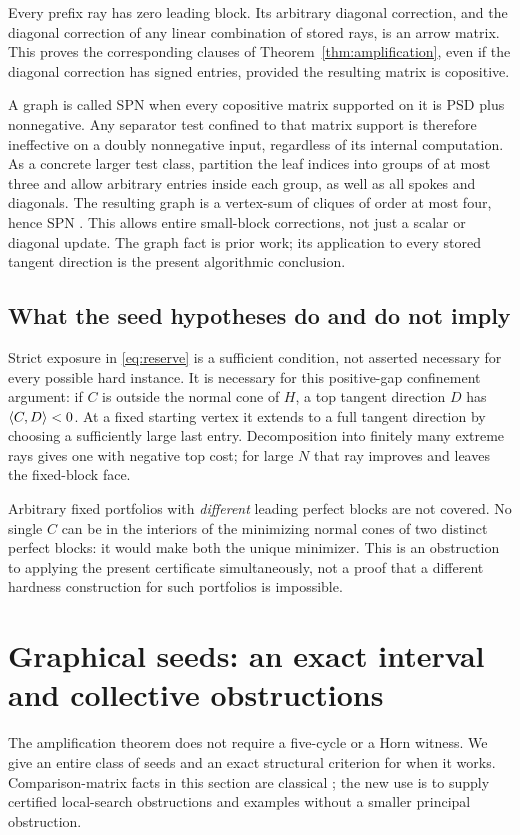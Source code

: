 \documentclass[11pt]{article}
\theoremstyle{definition}\newtheorem{definition}[theorem]{Definition}
\theoremstyle{remark}\newtheorem{remark}[theorem]{Remark}
\begin{document}
Every prefix ray has zero leading block. Its arbitrary diagonal correction, and the diagonal correction of any linear combination of stored rays, is an arrow matrix. This proves the corresponding clauses of Theorem~\ref{thm:amplification}, even if the diagonal correction has signed entries, provided the resulting matrix is copositive.

A graph is called SPN when every copositive matrix supported on it is PSD plus nonnegative. Any separator test confined to that matrix support is therefore ineffective on a doubly nonnegative input, regardless of its internal computation. As a concrete larger test class, partition the leaf indices into groups of at most three and allow arbitrary entries inside each group, as well as all spokes and diagonals. The resulting graph is a vertex-sum of cliques of order at most four, hence SPN \cite[Corollaries 4.4 and 5.3]{SPN}. This allows entire small-block corrections, not just a scalar or diagonal update. The graph fact is prior work; its application to every stored tangent direction is the present algorithmic conclusion.

\subsection{What the seed hypotheses do and do not imply}
Strict exposure in \eqref{eq:reserve} is a sufficient condition, not asserted necessary for every possible hard instance. It is necessary for this positive-gap confinement argument: if $C$ is outside the normal cone of $H$, a top tangent direction $D$ has $\langle C,D\rangle<0$. At a fixed starting vertex it extends to a full tangent direction by choosing a sufficiently large last entry. Decomposition into finitely many extreme rays gives one with negative top cost; for large $N$ that ray improves and leaves the fixed-block face.

Arbitrary fixed portfolios with \emph{different} leading perfect blocks are not covered. No single $C$ can be in the interiors of the minimizing normal cones of two distinct perfect blocks: it would make both the unique minimizer. This is an obstruction to applying the present certificate simultaneously, not a proof that a different hardness construction for such portfolios is impossible.

\section{Graphical seeds: an exact interval and collective obstructions}
The amplification theorem does not require a five-cycle or a Horn witness. We give an entire class of seeds and an exact structural criterion for when it works. Comparison-matrix facts in this section are classical \cite{Drew,Kogan}; the new use is to supply certified local-search obstructions and examples without a smaller principal obstruction.
\end{document}
